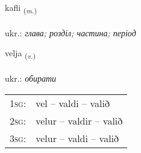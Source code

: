\documentclass[frontgrid, backgrid]{flacards}\usepackage[]{graphicx}\usepackage[]{xcolor}
\begin{document}
\renewcommand{\blhead}{\vskip5pt {\small\bfseries\footnotesize Nafnorð | іменник }}
\renewcommand{\bcfoot}{\vskip5pt \hspace{2pt}{\small\bfseries\footnotesize 1K}}


{kafli \small{\textsubscript{(\textit{m.})}} \\[1ex] %
\textphonetic{[kʰaplɪ]} \\
ukr.: \emph{глава; розділ; частина; період} \\  [2ex]
\renewcommand*{\arraystretch}{0.8}
}

\renewcommand{\flhead}{\vskip5pt \fboxsep=0pt {\small\bfseries\footnotesize Sagnorð | дієслово}}
\renewcommand{\fcfoot}{\vskip5pt \fboxsep=0pt \hspace{2pt}{\small\bfseries\footnotesize 1K}}

\renewcommand{\blhead}{\vskip5pt {\small\bfseries\footnotesize Sagnorð | дієслово }}
\renewcommand{\bcfoot}{\vskip5pt \hspace{2pt}{\small\bfseries\footnotesize 1K}}


{velja \small{\textsubscript{(\textit{v.})}} \\[1ex] %
\textphonetic{[vɛlja]} \\
ukr.: \emph{обирати} \\  [2ex]
\renewcommand*{\arraystretch}{0.8}
\begin{tabular}{p{1cm}l}
\textsc{1sg}: & vel -- valdi -- valið \\ 
\textsc{2sg}: & velur -- valdir -- valið \\ 
\textsc{3sg}: & velur -- valdi -- valið \\ 
\end{tabular}
}
\end{document}
